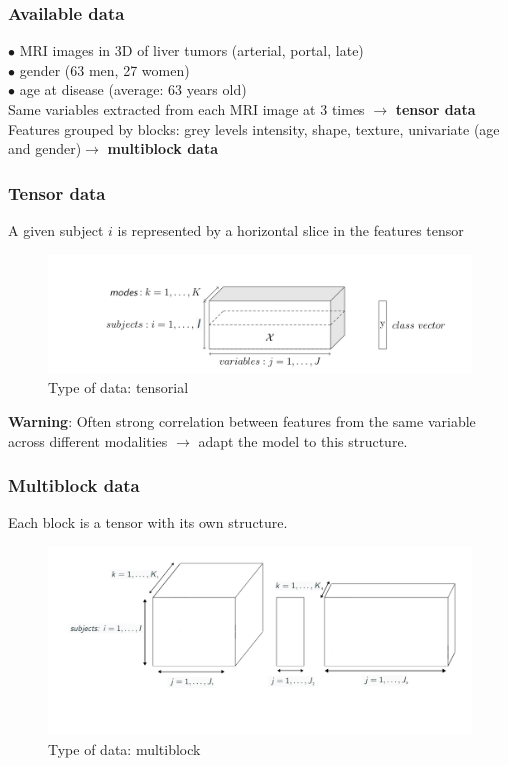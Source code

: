 \documentclass{beamer}
\begin{document}
\begin{frame}
    \frametitle{Available data}

    $\bullet$ MRI images in 3D of liver tumors (arterial, portal, late)\\[5 pt]
    $\bullet$ gender (63 men, 27 women)\\[5 pt]
    $\bullet$ age at disease (average: $63$ years old)\\[15 pt]

    Same variables extracted from each MRI image at 3 times  $\rightarrow$ \textbf{tensor data}\\[10 pt]

    Features grouped by blocks: grey levels intensity, shape, texture, univariate (age and gender)$\rightarrow$ \textbf{multiblock data}\\[10 pt]

    
\end{frame}




\begin{frame}
    \frametitle{Tensor data}
A given subject $i$ is represented by a horizontal slice in the features tensor
    \begin{figure}
        \centering
        \includegraphics[scale = 0.23]{images/tensor_mode.png}
        \caption{Type of data: tensorial}
    \end{figure}

\textbf{Warning}: Often strong correlation between features from the same variable across different modalities $\rightarrow$ adapt the model to this structure.
\end{frame}

\begin{frame}
    \frametitle{Multiblock data}
Each block is a tensor with its own structure.
    \begin{figure}
        \centering
        \includegraphics[scale = 0.25]{images/blocks.png}
        \caption{Type of data: multiblock}
    \end{figure}


\end{frame}
\end{document}
